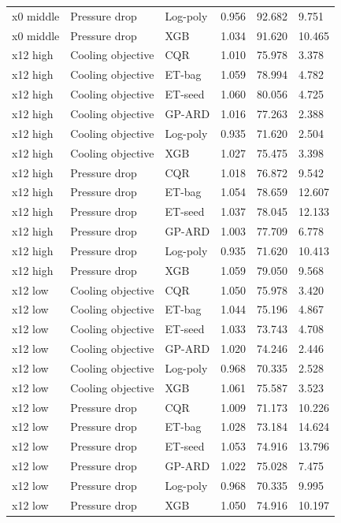 \begin{longtable}{llllll}
x0 middle & Pressure drop & Log-poly & 0.956 & 92.682 & 9.751\\
x0 middle & Pressure drop & XGB & 1.034 & 91.620 & 10.465\\
x12 high & Cooling objective & CQR & 1.010 & 75.978 & 3.378\\
x12 high & Cooling objective & ET-bag & 1.059 & 78.994 & 4.782\\
x12 high & Cooling objective & ET-seed & 1.060 & 80.056 & 4.725\\
x12 high & Cooling objective & GP-ARD & 1.016 & 77.263 & 2.388\\
x12 high & Cooling objective & Log-poly & 0.935 & 71.620 & 2.504\\
x12 high & Cooling objective & XGB & 1.027 & 75.475 & 3.398\\
x12 high & Pressure drop & CQR & 1.018 & 76.872 & 9.542\\
x12 high & Pressure drop & ET-bag & 1.054 & 78.659 & 12.607\\
x12 high & Pressure drop & ET-seed & 1.037 & 78.045 & 12.133\\
x12 high & Pressure drop & GP-ARD & 1.003 & 77.709 & 6.778\\
x12 high & Pressure drop & Log-poly & 0.935 & 71.620 & 10.413\\
x12 high & Pressure drop & XGB & 1.059 & 79.050 & 9.568\\
x12 low & Cooling objective & CQR & 1.050 & 75.978 & 3.420\\
x12 low & Cooling objective & ET-bag & 1.044 & 75.196 & 4.867\\
x12 low & Cooling objective & ET-seed & 1.033 & 73.743 & 4.708\\
x12 low & Cooling objective & GP-ARD & 1.020 & 74.246 & 2.446\\
x12 low & Cooling objective & Log-poly & 0.968 & 70.335 & 2.528\\
x12 low & Cooling objective & XGB & 1.061 & 75.587 & 3.523\\
x12 low & Pressure drop & CQR & 1.009 & 71.173 & 10.226\\
x12 low & Pressure drop & ET-bag & 1.028 & 73.184 & 14.624\\
x12 low & Pressure drop & ET-seed & 1.053 & 74.916 & 13.796\\
x12 low & Pressure drop & GP-ARD & 1.022 & 75.028 & 7.475\\
x12 low & Pressure drop & Log-poly & 0.968 & 70.335 & 9.995\\
x12 low & Pressure drop & XGB & 1.050 & 74.916 & 10.197\\

\end{longtable}
